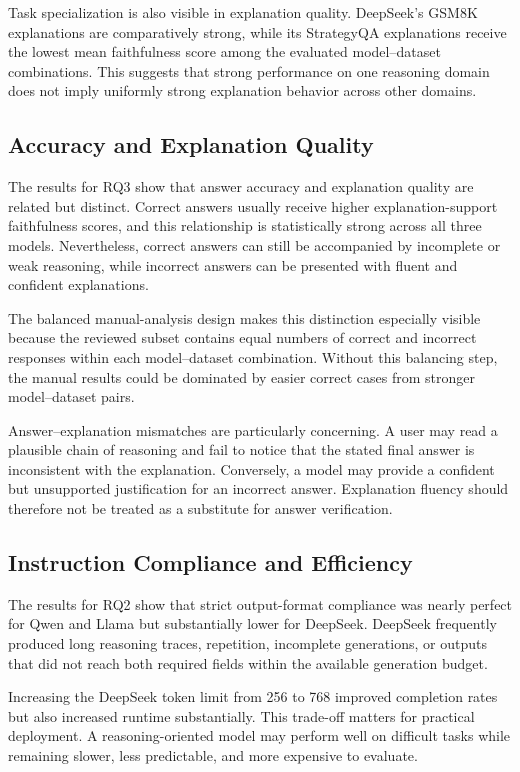 \documentclass{article}
\begin{document}
Task specialization is also visible in explanation quality. DeepSeek's
GSM8K explanations are comparatively strong, while its StrategyQA
explanations receive the lowest mean faithfulness score among the
evaluated model--dataset combinations. This suggests that strong
performance on one reasoning domain does not imply uniformly strong
explanation behavior across other domains.

\subsection{Accuracy and Explanation Quality}

The results for RQ3 show that answer accuracy and explanation quality
are related but distinct. Correct answers usually receive higher
explanation-support faithfulness scores, and this relationship is
statistically strong across all three models. Nevertheless, correct
answers can still be accompanied by incomplete or weak reasoning, while
incorrect answers can be presented with fluent and confident
explanations.

The balanced manual-analysis design makes this distinction especially
visible because the reviewed subset contains equal numbers of correct
and incorrect responses within each model--dataset combination. Without
this balancing step, the manual results could be dominated by easier
correct cases from stronger model--dataset pairs.

Answer--explanation mismatches are particularly concerning. A user may
read a plausible chain of reasoning and fail to notice that the stated
final answer is inconsistent with the explanation. Conversely, a model
may provide a confident but unsupported justification for an incorrect
answer. Explanation fluency should therefore not be treated as a
substitute for answer verification.

\subsection{Instruction Compliance and Efficiency}

The results for RQ2 show that strict output-format compliance was nearly
perfect for Qwen and Llama but substantially lower for DeepSeek.
DeepSeek frequently produced long reasoning traces, repetition,
incomplete generations, or outputs that did not reach both required
fields within the available generation budget.

Increasing the DeepSeek token limit from 256 to 768 improved completion
rates but also increased runtime substantially. This trade-off matters
for practical deployment. A reasoning-oriented model may perform well
on difficult tasks while remaining slower, less predictable, and more
expensive to evaluate.
\end{document}
